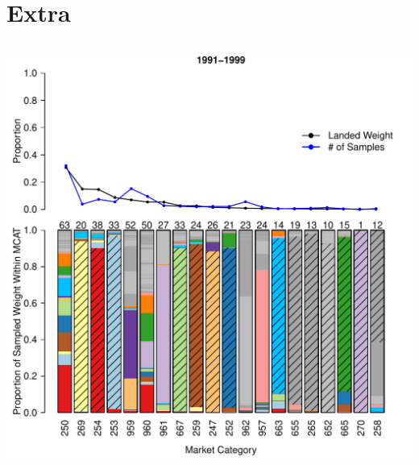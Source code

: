 \documentclass[ xcolor = pdftex, dvipsnames, table ]{beamer}
\begin{document}
%
%

%
\section{Extra}
\subsection{}
\begin{frame}
\centering
\includegraphics[height=\textheight]{../pictures/1991to1999Bar3.pdf}

\end{frame}
\end{document}
